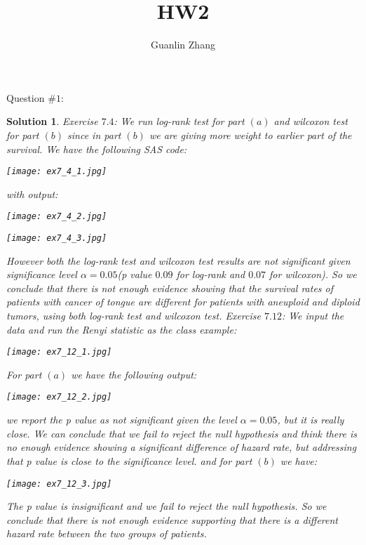 \documentclass[11pt]{article}
\title{HW2}
\author{Guanlin Zhang}
\newtheorem{sol}{Solution}
\begin{document}
Question $\# 1$:
\begin{sol}
	Exercise $7.4$:\vskip 2mm
	We run log-rank test for part $(a)$ and wilcoxon test for part $(b)$ since in part $(b)$ we are giving more weight to earlier part of the survival.\vskip 2mm
	We have the following SAS code:
	\begin{center}
		\texttt{[image: ex7\_4\_1.jpg]}
	\end{center}
	with output:
	\begin{center}
		\texttt{[image: ex7\_4\_2.jpg]}
	\end{center}
	\begin{center}
		\texttt{[image: ex7\_4\_3.jpg]}
	\end{center}
	However both the log-rank test and wilcoxon test results are not significant given significance level $\alpha = 0.05$(p value $0.09$ for log-rank and $0.07$ for wilcoxon).\vskip 2mm
	So we conclude that there is not enough evidence showing that the survival rates of patients with cancer of tongue are different for patients with aneuploid and diploid tumors, using both log-rank test and wilcoxon test.\vskip 2mm
	Exercise $7.12$:\vskip 2mm
	We input the data and run the Renyi statistic as the class example:
	\begin{center}
		\texttt{[image: ex7\_12\_1.jpg]}
	\end{center}
	For part $(a)$ we have the following output:
	\begin{center}
		\texttt{[image: ex7\_12\_2.jpg]}
	\end{center}
	we report the p value as not significant given the level $\alpha = 0.05$, but it is really close. We can conclude that we fail to reject the null hypothesis and think there is no enough evidence showing a significant difference of hazard rate, but addressing that p value is close to the significance level.
	and for part $(b)$ we have:
	\begin{center}
		\texttt{[image: ex7\_12\_3.jpg]}
	\end{center}
	The p value is insignificant and we fail to reject the null hypothesis. So we conclude that there is not enough evidence supporting that there is a different hazard rate between the two groups of patients.
\end{sol}
\end{document}
